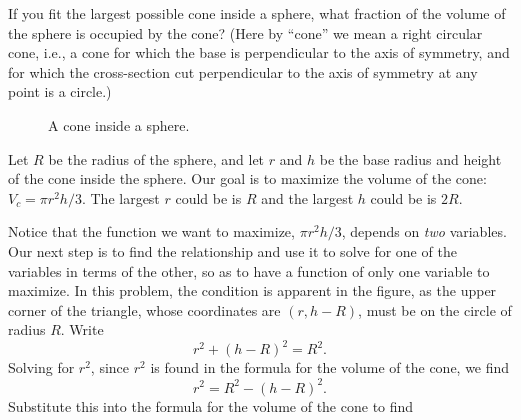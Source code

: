 \begin{example}
    If you fit the largest possible cone inside a sphere, what fraction of the
    volume of the sphere is occupied by the cone?  (Here by ``cone'' we mean a
    right circular cone, i.e., a cone for which the base is perpendicular to
    the axis of symmetry, and for which the cross-section cut perpendicular to
    the axis of symmetry at any point is a circle.) \cite{mooc}
    
    \begin{figure}[H]
        \centering
    
    \caption{A cone inside a sphere.}
    \label{fig:cone-sphere}
    \end{figure}
    
    \begin{solution}
    Let $R$ be the radius of the sphere, and let $r$ and $h$ be the base
    radius and height of the cone inside the sphere.  Our goal is to
    maximize the volume of the cone: $V_c=\pi r^2h/3$.  The largest $r$
    could be is $R$ and the largest $h$ could be is $2R$.
    
    Notice that the function we want to maximize, $\pi r^2h/3$, depends on
    \textit{two} variables.  Our next step is to find the relationship and
    use it to solve for one of the variables in terms of the other, so as
    to have a function of only one variable to maximize.  In this problem,
    the condition is apparent in the figure, as the upper corner of the
    triangle, whose coordinates are $(r,h-R)$, must be on the circle of
    radius $R$. Write
    \[
    r^2 + (h-R)^2=R^2.
    \] 
    Solving for $r^2$, since $r^2$ is found in the formula for the volume
    of the cone, we find 
    \[
    r^2=R^2-(h-R)^2.
    \]  
    Substitute this into the formula for the volume of the cone to find
    

\end{solution}
\end{example}
